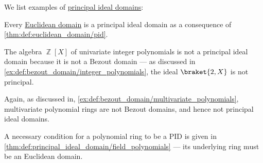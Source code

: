 \begin{example}\label{ex:def:principal_ideal_domain}
  We list examples of \hyperref[def:principal_ideal_domain]{principal ideal domains}:
  \begin{thmenum}
     Every \hyperref[def:euclidean_domain]{Euclidean domain} is a principal ideal domain as a consequence of \cref{thm:def:euclidean_domain/pid}.

     The algebra \( \BbbZ[X] \) of univariate integer polynomials is not a principal ideal domain because it is not a Bezout domain --- as discussed in \cref{ex:def:bezout_domain/integer_polynomials}, the ideal \( \braket{ 2, X } \) is not principal.

     Again, as discussed in, \cref{ex:def:bezout_domain/multivariate_polynomials}, multivariate polynomial rings are not Bezout domains, and hence not principal ideal domains.

    A necessary condition for a polynomial ring to be a PID is given in \cref{thm:def:principal_ideal_domain/field_polynomials} --- its underlying ring must be an Euclidean domain.
  \end{thmenum}
\end{example}

